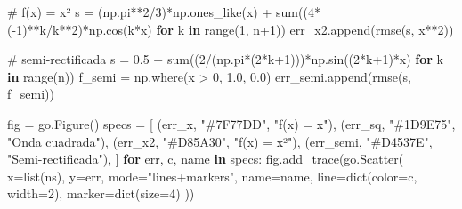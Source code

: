 \documentclass[
  letterpaper,
  DIV=11,
  numbers=noendperiod]{scrreprt}
\newenvironment{Shaded}{\begin{snugshade}}{\end{snugshade}}
\newcommand{\BuiltInTok}[1]{\textcolor[rgb]{0.00,0.23,0.31}{#1}}
\newcommand{\CommentTok}[1]{\textcolor[rgb]{0.37,0.37,0.37}{#1}}
\newcommand{\ControlFlowTok}[1]{\textcolor[rgb]{0.00,0.23,0.31}{\textbf{#1}}}
\newcommand{\DecValTok}[1]{\textcolor[rgb]{0.68,0.00,0.00}{#1}}
\newcommand{\FloatTok}[1]{\textcolor[rgb]{0.68,0.00,0.00}{#1}}
\newcommand{\KeywordTok}[1]{\textcolor[rgb]{0.00,0.23,0.31}{\textbf{#1}}}
\newcommand{\NormalTok}[1]{\textcolor[rgb]{0.00,0.23,0.31}{#1}}
\newcommand{\OperatorTok}[1]{\textcolor[rgb]{0.37,0.37,0.37}{#1}}
\newcommand{\StringTok}[1]{\textcolor[rgb]{0.13,0.47,0.30}{#1}}
\begin{document}
\begin{Shaded}
\begin{Highlighting}[]
    \CommentTok{\# f(x) = x²}
\NormalTok{    s }\OperatorTok{=}\NormalTok{ (np.pi}\OperatorTok{**}\DecValTok{2}\OperatorTok{/}\DecValTok{3}\NormalTok{)}\OperatorTok{*}\NormalTok{np.ones\_like(x) }\OperatorTok{+} \BuiltInTok{sum}\NormalTok{((}\DecValTok{4}\OperatorTok{*}\NormalTok{(}\OperatorTok{{-}}\DecValTok{1}\NormalTok{)}\OperatorTok{**}\NormalTok{k}\OperatorTok{/}\NormalTok{k}\OperatorTok{**}\DecValTok{2}\NormalTok{)}\OperatorTok{*}\NormalTok{np.cos(k}\OperatorTok{*}\NormalTok{x) }\ControlFlowTok{for}\NormalTok{ k }\KeywordTok{in} \BuiltInTok{range}\NormalTok{(}\DecValTok{1}\NormalTok{, n}\OperatorTok{+}\DecValTok{1}\NormalTok{))}
\NormalTok{    err\_x2.append(rmse(s, x}\OperatorTok{**}\DecValTok{2}\NormalTok{))}

    \CommentTok{\# semi{-}rectificada}
\NormalTok{    s }\OperatorTok{=} \FloatTok{0.5} \OperatorTok{+} \BuiltInTok{sum}\NormalTok{((}\DecValTok{2}\OperatorTok{/}\NormalTok{(np.pi}\OperatorTok{*}\NormalTok{(}\DecValTok{2}\OperatorTok{*}\NormalTok{k}\OperatorTok{+}\DecValTok{1}\NormalTok{)))}\OperatorTok{*}\NormalTok{np.sin((}\DecValTok{2}\OperatorTok{*}\NormalTok{k}\OperatorTok{+}\DecValTok{1}\NormalTok{)}\OperatorTok{*}\NormalTok{x) }\ControlFlowTok{for}\NormalTok{ k }\KeywordTok{in} \BuiltInTok{range}\NormalTok{(n))}
\NormalTok{    f\_semi }\OperatorTok{=}\NormalTok{ np.where(x }\OperatorTok{\textgreater{}} \DecValTok{0}\NormalTok{, }\FloatTok{1.0}\NormalTok{, }\FloatTok{0.0}\NormalTok{)}
\NormalTok{    err\_semi.append(rmse(s, f\_semi))}

\NormalTok{fig }\OperatorTok{=}\NormalTok{ go.Figure()}
\NormalTok{specs }\OperatorTok{=}\NormalTok{ [}
\NormalTok{    (err\_x,    }\StringTok{"\#7F77DD"}\NormalTok{, }\StringTok{"f(x) = x"}\NormalTok{),}
\NormalTok{    (err\_sq,   }\StringTok{"\#1D9E75"}\NormalTok{, }\StringTok{"Onda cuadrada"}\NormalTok{),}
\NormalTok{    (err\_x2,   }\StringTok{"\#D85A30"}\NormalTok{, }\StringTok{"f(x) = x²"}\NormalTok{),}
\NormalTok{    (err\_semi, }\StringTok{"\#D4537E"}\NormalTok{, }\StringTok{"Semi{-}rectificada"}\NormalTok{),}
\NormalTok{]}
\ControlFlowTok{for}\NormalTok{ err, c, name }\KeywordTok{in}\NormalTok{ specs:}
\NormalTok{    fig.add\_trace(go.Scatter(}
\NormalTok{        x}\OperatorTok{=}\BuiltInTok{list}\NormalTok{(ns), y}\OperatorTok{=}\NormalTok{err,}
\NormalTok{        mode}\OperatorTok{=}\StringTok{"lines+markers"}\NormalTok{, name}\OperatorTok{=}\NormalTok{name,}
\NormalTok{        line}\OperatorTok{=}\BuiltInTok{dict}\NormalTok{(color}\OperatorTok{=}\NormalTok{c, width}\OperatorTok{=}\DecValTok{2}\NormalTok{),}
\NormalTok{        marker}\OperatorTok{=}\BuiltInTok{dict}\NormalTok{(size}\OperatorTok{=}\DecValTok{4}\NormalTok{)}
\NormalTok{    ))}


\end{Highlighting}
\end{Shaded}
\end{document}
